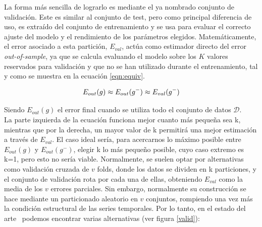 La forma más sencilla de lograrlo es mediante el ya nombrado conjunto de validación. Este es similar al conjunto de test, pero como principal diferencia de uso, es extraído del conjunto de entrenamiento y se usa para evaluar el correcto ajuste del modelo y el rendimiento de los parámetros elegidos. Matemáticamente, el error asociado a esta partición, $E_{val}$, actúa como estimador directo del error \textit{out-of-sample}, ya que se calcula evaluando el modelo sobre los $K$ valores reservados para validación y que no se han utilizado durante el entrenamiento, tal y como se muestra en la ecuación \ref{eqn:equiv}.

\begin{equation}
	\label{eqn:equiv}
	\centering
	E_{out}(g) \approx E_{out}(g^-) \approx E_{val}(g^-)
\end{equation}


Siendo $E_{out}(g)$ el error final cuando se utiliza todo el conjunto de datos $\mathcal D$.\\

La parte izquierda de la ecuación funciona mejor cuanto más pequeña sea k, mientras que por la derecha, un mayor valor de k permitirá una mejor estimación a través de $E_{val}$. El caso ideal sería, para acercarnos lo máximo posible entre $E_{out}(g)$ y $ E_{out}(g^-)$, elegir k lo más pequeño posible, cuyo caso extremo es k=1, pero esto no sería viable. Normalmente, se suelen optar por alternativas como validación cruzada de $v$ folds, donde los datos se dividen en k particiones, y el conjunto de validación rota por cada una de ellas, obteniendo $E_{val}$ como la media de los $v$ errores parciales. Sin embargo, normalmente su construcción se hace mediante un particionado aleatorio en $v$ conjuntos, rompiendo una vez más la condición estructural de las series temporales. Por lo tanto, en el estado del arte~\cite{bergmeir2012use} podemos encontrar varias alternativas (ver figura \ref{valid}):

